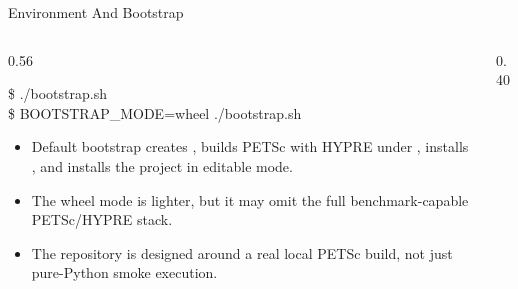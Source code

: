 \documentclass[aspectratio=169,10pt]{beamer}
\begin{document}
\begin{frame}{Environment And Bootstrap}
\small
\begin{columns}[T,totalwidth=\textwidth]
\begin{column}{0.56\textwidth}
\begin{pseudobox}
\$ ./bootstrap.sh\\
\$ BOOTSTRAP\_MODE=wheel ./bootstrap.sh
\end{pseudobox}
\begin{softbox}
\begin{itemize}
  \item Default bootstrap creates , builds PETSc with HYPRE under , installs , and installs the project in editable mode.
  \item The wheel mode is lighter, but it may omit the full benchmark-capable PETSc/HYPRE stack.
  \item The repository is designed around a real local PETSc build, not just pure-Python smoke execution.
\end{itemize}
\end{softbox}
\end{column}
\begin{column}{0.40\textwidth}
\end{column}
\end{columns}
\end{frame}
\end{document}
